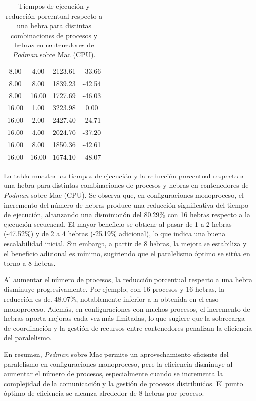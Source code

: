 \begin{table}[ht]
\begin{tabular}{|c|c|c|c|}
        8.00              & 4.00            & 2123.61             & -33.66                         \\
        8.00              & 8.00            & 1839.23             & -42.54                         \\
        8.00              & 16.00           & 1727.69             & -46.03                         \\
        16.00             & 1.00            & 3223.98             & 0.00                           \\
        16.00             & 2.00            & 2427.40             & -24.71                         \\
        16.00             & 4.00            & 2024.70             & -37.20                         \\
        16.00             & 8.00            & 1850.36             & -42.61                         \\
        16.00             & 16.00           & 1674.10             & -48.07                         \\
        \hline
    \end{tabular}
    \caption{Tiempos de ejecución y reducción porcentual respecto a una hebra para distintas combinaciones de procesos y hebras en contenedores de \textit{Podman} sobre Mac (CPU).}
    \label{tab:thread_sweep_mac_podman_time}
\end{table}

La tabla muestra los tiempos de ejecución y la reducción porcentual respecto a una hebra para distintas combinaciones de procesos y hebras en contenedores de \textit{Podman} sobre Mac (CPU). Se observa que, en configuraciones monoproceso, el incremento del número de hebras produce una reducción significativa del tiempo de ejecución, alcanzando una disminución del 80.29\% con 16 hebras respecto a la ejecución secuencial. El mayor beneficio se obtiene al pasar de 1 a 2 hebras (-47.52\%) y de 2 a 4 hebras (-25.19\% adicional), lo que indica una buena escalabilidad inicial. Sin embargo, a partir de 8 hebras, la mejora se estabiliza y el beneficio adicional es mínimo, sugiriendo que el paralelismo óptimo se sitúa en torno a 8 hebras.

Al aumentar el número de procesos, la reducción porcentual respecto a una hebra disminuye progresivamente. Por ejemplo, con 16 procesos y 16 hebras, la reducción es del 48.07\%, notablemente inferior a la obtenida en el caso monoproceso. Además, en configuraciones con muchos procesos, el incremento de hebras aporta mejoras cada vez más limitadas, lo que sugiere que la sobrecarga de coordinación y la gestión de recursos entre contenedores penalizan la eficiencia del paralelismo.

En resumen, \textit{Podman} sobre Mac permite un aprovechamiento eficiente del paralelismo en configuraciones monoproceso, pero la eficiencia disminuye al aumentar el número de procesos, especialmente cuando se incrementa la complejidad de la comunicación y la gestión de procesos distribuidos. El punto óptimo de eficiencia se alcanza alrededor de 8 hebras por proceso.